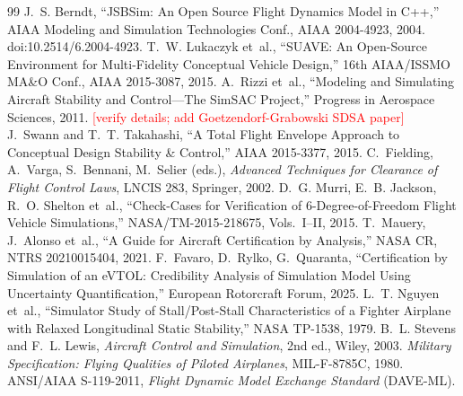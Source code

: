 \documentclass[11pt]{article}
\newcommand{\todo}[1]{\textcolor{red}{[#1]}}
\begin{document}
\begin{thebibliography}{99}\small
{} J.~S. Berndt, ``JSBSim: An Open Source
  Flight Dynamics Model in C++,'' AIAA Modeling and Simulation Technologies
  Conf., AIAA 2004-4923, 2004. doi:10.2514/6.2004-4923.
 T.~W. Lukaczyk et~al., ``SUAVE:
  An Open-Source Environment for Multi-Fidelity Conceptual Vehicle Design,''
  16th AIAA/ISSMO MA\&O Conf., AIAA 2015-3087, 2015.
 A.~Rizzi et~al., ``Modeling and
  Simulating Aircraft Stability and Control---The SimSAC Project,'' Progress
  in Aerospace Sciences, 2011. \todo{verify details; add
  Goetzendorf-Grabowski SDSA paper}
 J.~Swann and T.~T. Takahashi,
  ``A Total Flight Envelope Approach to Conceptual Design Stability \&
  Control,'' AIAA 2015-3377, 2015.
 C.~Fielding, A.~Varga,
  S.~Bennani, M.~Selier (eds.), \emph{Advanced Techniques for Clearance of
  Flight Control Laws}, LNCIS 283, Springer, 2002.
 D.~G. Murri, E.~B. Jackson,
  R.~O. Shelton et~al., ``Check-Cases for Verification of
  6-Degree-of-Freedom Flight Vehicle Simulations,'' NASA/TM-2015-218675,
  Vols.~I--II, 2015.
 T.~Mauery, J.~Alonso et~al.,
  ``A Guide for Aircraft Certification by Analysis,'' NASA CR, NTRS
  20210015404, 2021.
 F.~Favaro, D.~Rylko, G.~Quaranta,
  ``Certification by Simulation of an eVTOL: Credibility Analysis of
  Simulation Model Using Uncertainty Quantification,'' European Rotorcraft
  Forum, 2025.
 L.~T. Nguyen et~al., ``Simulator
  Study of Stall/Post-Stall Characteristics of a Fighter Airplane with
  Relaxed Longitudinal Static Stability,'' NASA TP-1538, 1979.
 B.~L. Stevens and
  F.~L. Lewis, \emph{Aircraft Control and Simulation}, 2nd ed., Wiley, 2003.
 \emph{Military Specification: Flying
  Qualities of Piloted Airplanes}, MIL-F-8785C, 1980.
 ANSI/AIAA S-119-2011, \emph{Flight Dynamic Model
  Exchange Standard} (DAVE-ML).
\end{thebibliography}
\end{document}
